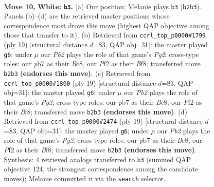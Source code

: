 \documentclass[11pt]{article}
\begin{document}
\clearpage

\begin{figure}[p]\centering
\begin{subfigure}{0.46\textwidth}\centering
\resizebox{\linewidth}{!}{%
\newchessgame
\chessboard[
  setfen={rnbqr1k1/pp2bppp/2p5/3p4/3P1Bn1/2N1P3/PPQ1NPPP/R3KB1R w KQ - 6 10},
  showmover=false,
  pgfstyle=straightmove, color=movearrow, markmove={b2-b3}
]}
\caption{}
\end{subfigure}\hfill
\begin{subfigure}{0.46\textwidth}\centering
\resizebox{\linewidth}{!}{%
\newchessgame
\chessboard[
  setfen={r1b1kb1r/ppqpnppp/4p3/3n4/2NP4/2PB3N/PP3PPP/R1BQK2R b KQkq - 2 10},
  showmover=false,
  pgfstyle=straightmove, color=movearrow, markmove={g7-g6}
]}
\caption{}
\end{subfigure}
\\[4pt]
\begin{subfigure}{0.46\textwidth}\centering
\resizebox{\linewidth}{!}{%
\newchessgame
\chessboard[
  setfen={r1b1kb1r/ppqpnppp/4p3/3n4/2NP4/2PB3N/PP3PPP/R1BQK2R b KQkq - 2 10},
  showmover=false,
  pgfstyle=straightmove, color=movearrow, markmove={g7-g6}
]}
\caption{}
\end{subfigure}\hfill
\begin{subfigure}{0.46\textwidth}\centering
\resizebox{\linewidth}{!}{%
\newchessgame
\chessboard[
  setfen={r1b1kb1r/ppqpnppp/4p3/3n4/2NP4/2PB3N/PP3PPP/R1BQK2R b KQkq - 2 10},
  showmover=false,
  pgfstyle=straightmove, color=movearrow, markmove={g7-g6}
]}
\caption{}
\end{subfigure}
\caption{\textbf{Move 10, White: \texttt{b3}.} (a) Our position; Melanie plays \texttt{b3} (\texttt{b2b3}). Panels (b)--(d) are the retrieved master positions whose correspondence most drove this move (highest QAP objective among those that transfer to it). (b) Retrieved from \texttt{ccrl\_top\_p0000\#1799} (ply 19) [structural distance $d$=83, QAP obj=31]: the master played \texttt{g6}; under $\mu$ our \emph{Pb2} plays the role of that game's \emph{Pg2}; cross-type roles: our \emph{p}b7 as their \emph{B}c8, our \emph{P}f2 as their \emph{B}f8; transferred move \texttt{b2b3} \textbf{(endorses this move)}. (c) Retrieved from \texttt{ccrl\_top\_p0000\#1800} (ply 19) [structural distance $d$=83, QAP obj=31]: the master played \texttt{g6}; under $\mu$ our \emph{Pb2} plays the role of that game's \emph{Pg2}; cross-type roles: our \emph{p}b7 as their \emph{B}c8, our \emph{P}f2 as their \emph{B}f8; transferred move \texttt{b2b3} \textbf{(endorses this move)}. (d) Retrieved from \texttt{ccrl\_top\_p0000\#2474} (ply 19) [structural distance $d$=83, QAP obj=31]: the master played \texttt{g6}; under $\mu$ our \emph{Pb2} plays the role of that game's \emph{Pg2}; cross-type roles: our \emph{p}b7 as their \emph{B}c8, our \emph{P}f2 as their \emph{B}f8; transferred move \texttt{b2b3} \textbf{(endorses this move)}. Synthesis: 4 retrieved analogs transferred to \texttt{b3} (summed QAP objective 124, the strongest correspondence among the candidate moves); Melanie committed it via the \texttt{search} selector.}
\label{fig:thought-m18}
\end{figure}
\end{document}
